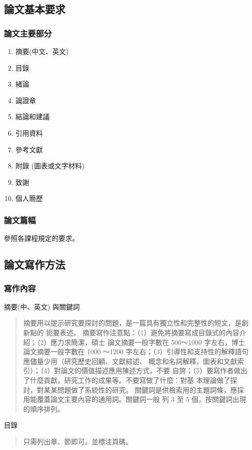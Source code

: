 \documentclass[
    writingLanguage=chinese, %
    addPageTitle=on,  %
    addDeclaration=on, %
    addMUSTlog=off, %
    addFigTOC=on, %
    addTabTOC=on, %
    refIndent=off, %
    printMod=off, %
]{.def/must}
\begin{document}
\subsection{論文基本要求}
\subsubsection{論文主要部分}

\begin{enumerate}
    \item 摘要(中文、英文)
    \item 目錄
    \item 緒論
    \item 論證章
    \item 結論和建議
    \item 引用資料
    \item 參考文獻
    \item 附錄 (圖表或文字材料)
    \item 致謝
    \item 個人簡歷
\end{enumerate}

\subsubsection{論文篇幅}
參照各課程規定的要求。

\subsection{論文寫作方法}
\subsubsection{寫作內容}
\noindent\faHandORight 摘要(中、英文) 與關鍵詞
\begin{quote}
摘要用以提示研究要探討的問題，是一篇具有獨立性和完整性的短文，是創新點的
扼要表述。
摘要寫作注意點：（1）避免將摘要寫成目錄式的內容介紹；（2）應力求簡潔，碩士
論文摘要一般字數在 500～1000 字左右，博士論文摘要一般字數在 1000 ～1200
字左右；（3）引導性和支持性的解釋語句應儘量少用（研究歷史回顧、文獻綜述、
概念和名詞解釋，圖表和文獻索引）；（4）對論文的價值描述應用陳述方式，不要
自誇；（5）要寫作者做出了什麼貢獻，研究工作的成果等。不要寫做了什麼：對基
本理論做了探討，對某某問題做了系統性的研究。
關鍵詞是供檢索用的主題詞條，應採用能覆蓋論文主要內容的通用詞。關鍵詞一般
列 3 至 5 個，按關鍵詞出現的順序排列。
\end{quote}


\noindent\faHandORight 目錄
\begin{quote}
 只需列出章、節即可。並標注頁碼。
    
\end{quote}
\end{document}
